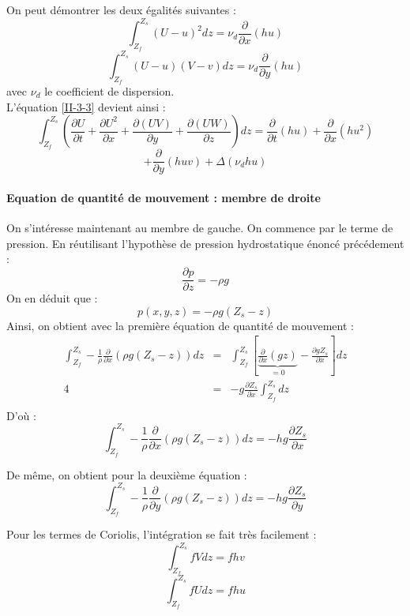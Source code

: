 On peut démontrer les deux égalités suivantes :
\[\int_{Z_f}^{Z_s} (U-u)^2 dz=\nu_d\frac{\partial}{\partial x}(hu)\]
\[\int_{Z_f}^{Z_s} (U-u)(V-v) dz=\nu_d \frac{\partial}{\partial y} (hu)\]
avec $\nu_d$ le coefficient de dispersion.\\
L'équation \ref{II-3-3} devient ainsi :
\begin{equation} \label{II-3-4}
	\int_{Z_f}^{Z_s} \left(\frac{\partial U}{\partial t} + \frac{\partial U^2}{\partial x} + \frac{\partial (UV)}{\partial y} +\frac{\partial (UW)}{\partial z}\right) dz =\frac{\partial}{\partial t} (hu) + \frac{\partial}{\partial x}(hu^2)
\end{equation}
\[+\frac{\partial}{\partial y}(huv)+\Delta(\nu_dhu)\]

\paragraph{Equation de quantité de mouvement : membre de droite}
On s'intéresse maintenant au membre de gauche. On commence par le terme de pression. En réutilisant l'hypothèse de pression hydrostatique énoncé précédement :
	\[\frac{\partial p}{\partial z}=-\rho g\]
On en déduit que :
	\[p(x,y,z)=-\rho g(Z_s-z)\]
Ainsi, on obtient avec la première équation de quantité de mouvement :
\begin{eqnarray*}
	\int_{Z_f}^{Z_s} -\frac{1}{\rho} \frac{\partial}{\partial x} (\rho g(Z_s-z)) dz &=& \int_{Z_f}^{Z_s} \left[ \underbrace{\frac{\partial}{\partial x} (gz)}_{=0}-\frac{\partial gZ_s}{\partial x} \right] dz \\
4							       &=& -g \frac{\partial Z_s}{\partial x} \int_{Z_f}^{Z_s} dz \\
\end{eqnarray*}
D'où :
\begin{equation} \label{II-2-5} \int_{Z_f}^{Z_s} -\frac{1}{\rho} \frac{\partial}{\partial x} (\rho g(Z_s-z)) dz= -hg\frac{\partial Z_s}{\partial x} \end{equation}

De même, on obtient pour la deuxième équation :
\begin{equation} \label{II-2-6} \int_{Z_f}^{Z_s} -\frac{1}{\rho} \frac{\partial}{\partial y} (\rho g(Z_s-z)) dz= -hg\frac{\partial Z_s}{\partial y} \end{equation}

Pour les termes de Coriolis, l'intégration se fait très facilement :
\begin{equation} \label{II-2-7} \int_{Z_f}^{Z_s} fV dz = fhv \end{equation}
\begin{equation} \label{II-2-8} \int_{Z_f}^{Z_s} fU dz = fhu \end{equation}

